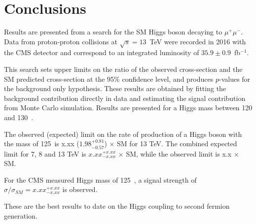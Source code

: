 \clearpage
\section{Conclusions}
\label{conclusions}

Results are presented from a search for the SM Higgs boson decaying to $\mu^+\mu^-$. Data from proton-proton
collisions at $\sqrt{s}=13$~TeV were recorded in 2016 with the CMS detector and correspond
to an integrated luminosity of $35.9\pm0.9$~fb$^{-1}$.

This search sets upper limits on the ratio of the observed cross-section and the SM predicted cross-section
at the 95\% confidence level, and produces $p$-values for the background only hypothesis. These results are
obtained by fitting the background contribution directly in data and estimating the signal contribution from
Monte Carlo simulation. Results are presented for a Higgs mass between 120 and 130~\GeVcc.

The observed (expected) limit on the rate of production of a Higgs boson with the mass of
125~\GeVcc is x.xx ($1.98^{+0.81}_{-0.57}$) $\times$ SM for 13 TeV.
The combined expected limit for 7, 8 and 13 TeV is $x.xx^{+x.xx}_{-x.xx}$ $\times$ SM, while the observed limit
is x.x $\times$ SM.

For the CMS measured Higgs mass of 125~\GeVcc, a signal strength
of $\sigma/\sigma_{SM}=x.xx^{+x.xx}_{-x.xx}$ is observed.

These are the best results to date on the Higgs coupling to second fermion generation.



